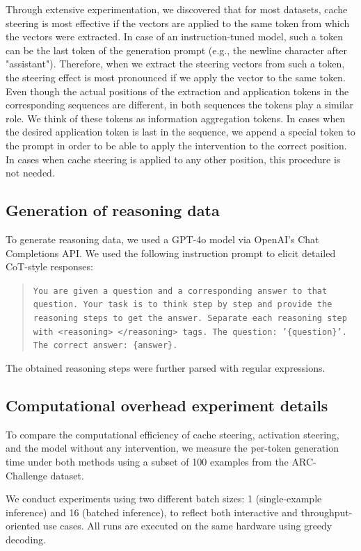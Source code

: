 \documentclass{article} %
\begin{document}
Through extensive experimentation, we discovered that for most datasets, cache steering is most effective if the vectors are applied to the same token from which the vectors were extracted. In case of an instruction-tuned model, such a token can be the last token of the generation prompt (e.g., the newline character after "assistant"). Therefore, when we extract the steering vectors from such a token, the steering effect is most pronounced if we apply the vector to the same token. Even though the actual positions of the extraction and application tokens in the corresponding sequences are different, in both sequences the tokens play a similar role. We think of these tokens as information aggregation tokens. In cases when the desired application token is last in the sequence, we append a special token to the prompt in order to be able to apply the intervention to the correct position. In cases when cache steering is applied to any other position, this procedure is not needed.

\subsection{Generation of reasoning data}\label{gpt4o_dataset}
To generate reasoning data, we used a GPT-4o model via OpenAI's Chat Completions API. We used the following instruction prompt to elicit detailed CoT-style responses:
\begin{quote}
\texttt{You are given a question and a corresponding answer to that question. Your task is to think step by step and provide the reasoning steps to get the answer. Separate each reasoning step with <reasoning> </reasoning> tags. The question: '\{question\}'. The correct answer: \{answer\}.}
\end{quote}
The obtained reasoning steps were further parsed with regular expressions.

\subsection{Computational overhead experiment details} \label{computational_overhead_details}

To compare the computational efficiency of cache steering,  activation steering, and the model without any intervention, we measure the per-token generation time under both methods using a subset of 100 examples from the ARC-Challenge dataset.

We conduct experiments using two different batch sizes: 1 (single-example inference) and 16 (batched inference), to reflect both interactive and throughput-oriented use cases. All runs are executed on the same hardware using greedy decoding.
\end{document}
